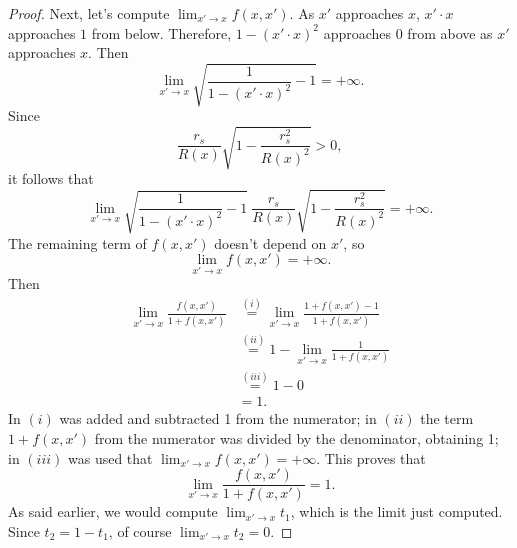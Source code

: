 \documentclass[10pt,a4paper]{amsart}
\begin{document}
\begin{proof}
	Next, let's compute $\lim_{x' \to x} f(x,x')$. As $x'$ approaches $x$, $x' \cdot x$ approaches $1$ from below. Therefore, $1 - (x' \cdot x)^2$ approaches $0$ from above as $x'$ approaches $x$. Then
	\begin{equation}
		\label{equation: limit square root}
		\lim_{x' \to x} \sqrt{ \frac{1}{1 - (x' \cdot x )^2} -1} = +\infty .
	\end{equation}
	Since
	\begin{equation}
		\frac{r_s}{R(x)} \sqrt{1 - \frac{r_s^2}{R(x)^2}} > 0,
	\end{equation}
	it follows that
	\begin{equation}
		\lim_{x' \to x} \sqrt{ \frac{1}{1 - (x' \cdot x )^2} -1} \ \frac{r_s}{R(x)} \sqrt{1 - \frac{r_s^2}{R(x)^2}} = +\infty.
	\end{equation}
	The remaining term of $f(x, x')$ doesn't depend on $x'$, so
	\begin{equation}
		\lim_{x' \to x} f(x, x') = +\infty.
	\end{equation}
	Then
	\begin{align*}
		\lim_{x' \to x} \frac{f(x,x')}{1+f(x,x')} &\stackrel{(i)}{=} \lim_{x' \to x} \frac{1+f(x,x')-1}{1+f(x,x')} \\
		&\stackrel{(ii)}{=} 1-\lim_{x' \to x} \frac{1}{1+f(x,x')} \\
		&\stackrel{(iii)}{=} 1 - 0 \\
		&= 1.
	\end{align*}
	In $(i)$ was added and subtracted 1 from the numerator; in $(ii)$ the term $1+f(x,x')$ from the numerator was divided by the denominator, obtaining 1; in $(iii)$ was used that $\lim_{x' \to x} f(x, x') = +\infty$. This proves that
	\begin{equation}
		\label{equation: limit fraction left}
		\lim_{x' \to x} \frac{f(x,x')}{1+f(x,x')} = 1.
	\end{equation}
	As said earlier, we would compute $\lim_{x' \to x} t_1$, which is the limit just computed. Since $t_2 = 1 - t_1$, of course $\lim_{x' \to x} t_2 = 0$.
	

\end{proof}
\end{document}
